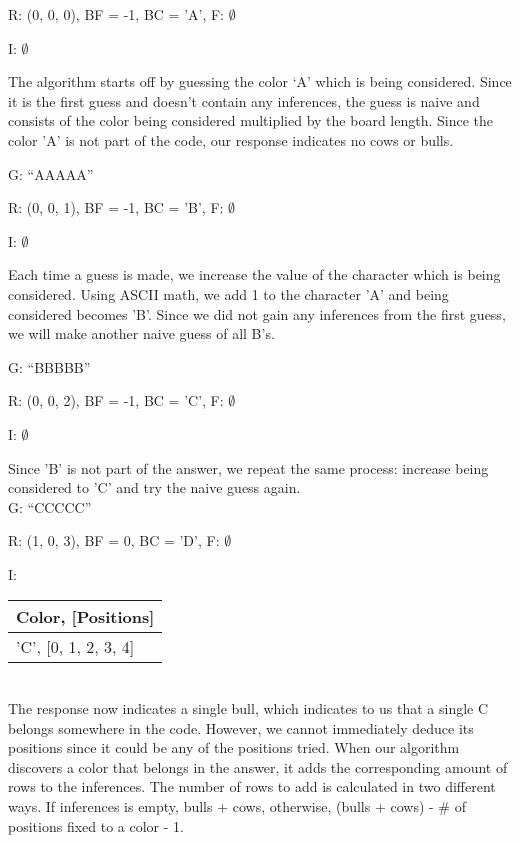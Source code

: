 \documentclass[11pt]{article}
\begin{document}
    \noindent R: (0, 0, 0), BF = -1, BC = 'A', F: $\emptyset$

    \noindent I: $\emptyset$

    The algorithm starts off by guessing the color ‘A’ which is being considered. Since it is the first guess and doesn’t contain any inferences, the guess is naive and consists of the color being considered multiplied by the board length. Since the color 'A' is not part of the code, our response indicates no cows or bulls.

    \noindent G: \enquote{AAAAA}

    \noindent R: (0, 0, 1), BF = -1, BC = 'B', F: $\emptyset$

    \noindent I: $\emptyset$

    Each time a guess is made, we increase the value of the character which is being considered. Using ASCII math, we add 1 to the character 'A' and being considered becomes 'B'. Since we did not gain any inferences from the first guess, we will make another naive guess of all B's.

    \noindent G: \enquote{BBBBB}

    \noindent R: (0, 0, 2), BF = -1, BC = 'C', F: $\emptyset$

    \noindent I: $\emptyset$

    Since 'B' is not part of the answer, we repeat the same process: increase being considered to 'C' and try the naive guess again.\\

    \noindent G: \enquote{CCCCC}

    \noindent R: (1, 0, 3), BF = 0, BC = 'D', F: $\emptyset$

    \noindent I: \begin{tabularx}{.25\textwidth}{|X|}
        \hline
        Color, [Positions]\\\hline 
        'C', [0, 1, 2, 3, 4]\\\hline
    \end{tabularx}\\
    
    The response now indicates a single bull, which indicates to us that a single C belongs somewhere in the code. However, we cannot immediately deduce its positions since it could be any of the positions tried. 
    When our algorithm discovers a color that belongs in the answer, it adds the corresponding amount of rows to the inferences. The number of rows to add is calculated in two different ways. If inferences is empty, bulls + cows, otherwise, (bulls + cows) - \# of positions fixed to a color - 1.
\end{document}
